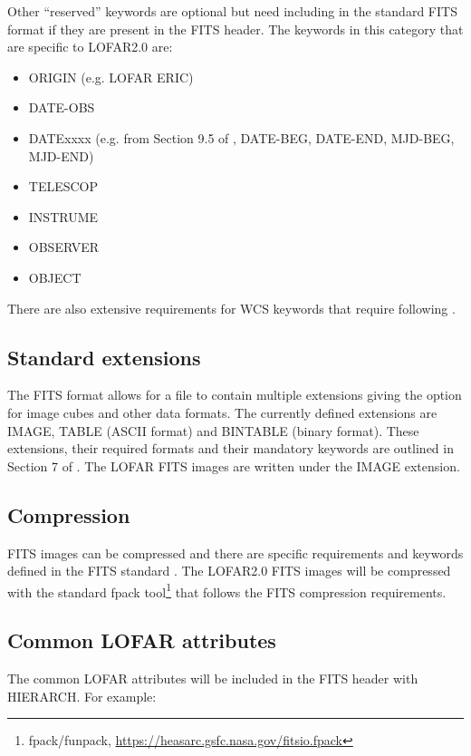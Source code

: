 \documentclass[a4paper,10pt,bibtotoc]{scrartcl}
\begin{document}
Other ``reserved'' keywords are optional but need including in the standard FITS format if they are present in the FITS header. The keywords in this category that are specific to LOFAR2.0 are:
\begin{itemize}
    \item ORIGIN (e.g. LOFAR ERIC)
    \item DATE-OBS
    \item DATExxxx (e.g. from Section 9.5 of \cite{FITSv3.0}, DATE-BEG, DATE-END, MJD-BEG, MJD-END)
    \item TELESCOP
    \item INSTRUME
    \item OBSERVER
    \item OBJECT
\end{itemize}

There are also extensive requirements for WCS keywords that require following \citep[Section 8;][]{FITSv3.0}.

\subsection{Standard extensions}

The FITS format allows for a file to contain multiple extensions giving the option for image cubes and other data formats. The currently defined extensions are IMAGE, TABLE (ASCII format) and BINTABLE (binary format). These extensions, their required formats and their mandatory keywords are outlined in Section 7 of \cite{FITSv3.0}. The LOFAR FITS images are written under the IMAGE extension.

\subsection{Compression}

FITS images can be compressed and there are specific requirements and keywords defined in the FITS standard \citep[Section 10;][]{FITSv3.0}. The LOFAR2.0 FITS images will be compressed with the standard fpack tool\footnote{fpack/funpack, \url{https://heasarc.gsfc.nasa.gov/fitsio.fpack}} that follows the FITS compression requirements.

\subsection{Common LOFAR attributes}
\label{sec:CLA}

The common LOFAR attributes will be included in the FITS header with {\sc HIERARCH}. For example:
\end{document}
